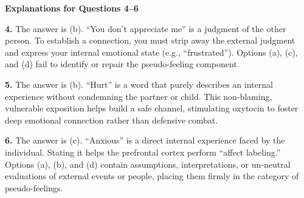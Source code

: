\begin{practiceexercise}
\textbf{Explanations for Questions 4--6}

\textbf{4.} The answer is (b). ``You don't appreciate me'' is a judgment of the other person. To establish a connection, you must strip away the external judgment and express your internal emotional state (e.g., ``frustrated''). 
Options (a), (c), and (d) fail to identify or repair the pseudo-feeling component.

\textbf{5.} The answer is (b). ``Hurt'' is a word that purely describes an internal experience without condemning the partner or child. This non-blaming, vulnerable exposition helps build a safe channel, stimulating oxytocin to foster deep emotional connection rather than defensive combat.

\textbf{6.} The answer is (c). ``Anxious'' is a direct internal experience faced by the individual. Stating it helps the prefrontal cortex perform ``affect labeling.'' Options (a), (b), and (d) contain assumptions, interpretations, or un-neutral evaluations of external events or people, placing them firmly in the category of pseudo-feelings.
\vspace{\fill}
\newpage


\end{practiceexercise}
